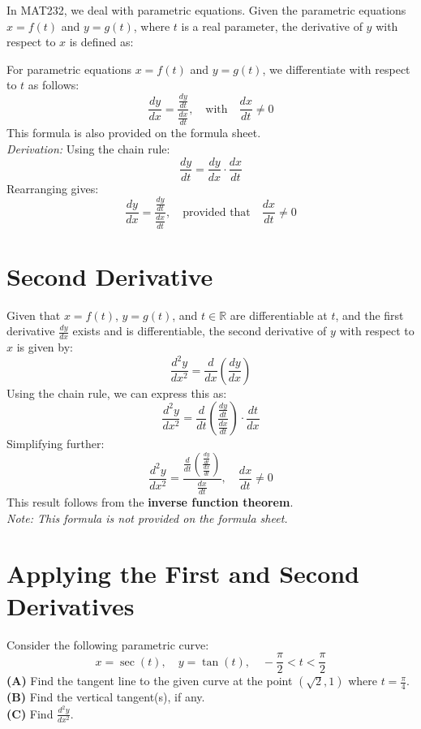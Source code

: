 \documentclass{article}
\begin{document}
In MAT232, we deal with parametric equations. Given the parametric equations \( x = f(t) \) and \( y = g(t) \), where \( t \) is a real parameter, the derivative of \( y \) with respect to \( x \) is defined as:
\begin{definitionbox}
For parametric equations \( x = f(t) \) and \( y = g(t) \), we differentiate with respect to \( t \) as follows:
\[
    \frac{dy}{dx} = \frac{\frac{dy}{dt}}{\frac{dx}{dt}}, \quad \text{with} \quad \frac{dx}{dt} \neq 0
\]
This formula is also provided on the formula sheet. \\
\textit{Derivation:} Using the chain rule:
\[
    \frac{dy}{dt} = \frac{dy}{dx} \cdot \frac{dx}{dt}
\]
Rearranging gives:
\[
    \frac{dy}{dx} = \frac{\frac{dy}{dt}}{\frac{dx}{dt}}, \quad \text{provided that} \quad \frac{dx}{dt} \neq 0
\]
\end{definitionbox}

\section*{Second Derivative}
\begin{definitionbox}
Given that \( x = f(t) \), \( y = g(t) \), and \( t \in \mathbb{R} \) are differentiable at \( t \), and the first derivative \( \frac{dy}{dx} \) exists and is differentiable, the second derivative of \( y \) with respect to \( x \) is given by:
\[
    \frac{d^2y}{dx^2} = \frac{d}{dx}\left(\frac{dy}{dx}\right)
\]
Using the chain rule, we can express this as:
\[
    \frac{d^2y}{dx^2} = \frac{d}{dt}\left(\frac{\frac{dy}{dt}}{\frac{dx}{dt}}\right) \cdot \frac{dt}{dx}
\]
Simplifying further:
\[
    \frac{d^2y}{dx^2} = \frac{\frac{d}{dt}\left(\frac{\frac{dy}{dt}}{\frac{dx}{dt}}\right)}{\frac{dx}{dt}}, \quad \frac{dx}{dt} \neq 0
\]
This result follows from the \textbf{inverse function theorem}. \\
\textit{Note: This formula is not provided on the formula sheet.}
\end{definitionbox}

\section*{Applying the First and Second Derivatives}
\begin{examplebox}
Consider the following parametric curve:
\[
    x = \sec(t), \quad y = \tan(t), \quad -\frac{\pi}{2} < t < \frac{\pi}{2}
\]
\textbf{(A)} Find the tangent line to the given curve at the point \( (\sqrt{2}, 1) \) where \( t = \frac{\pi}{4} \). \\
\textbf{(B)} Find the vertical tangent(s), if any. \\
\textbf{(C)} Find \( \frac{d^2y}{dx^2} \).
\end{examplebox}
\end{document}
